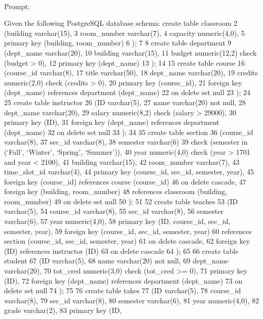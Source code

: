 \documentclass[
  letterpaper,
  DIV=11,
  numbers=noendperiod]{scrartcl}
\makeatletter
\let\oldparagraph\paragraph
\renewcommand{\paragraph}{
    \@ifstar
      \xxxParagraphStar
      \xxxParagraphNoStar
  }
\newcommand{\xxxParagraphStar}[1]{\oldparagraph*{#1}\mbox{}}
\newcommand{\xxxParagraphNoStar}[1]{\oldparagraph{#1}\mbox{}}
\makeatother
\begin{document}
\paragraph{Prompt:}\label{prompt-1}

Given the following PostgreSQL database schema: create table classroom 2
(building varchar(15), 3 room\_number varchar(7), 4 capacity
numeric(4,0), 5 primary key (building, room\_number) 6 ); 7 8 create
table department 9 (dept\_name varchar(20), 10 building varchar(15), 11
budget numeric(12,2) check (budget \textgreater{} 0), 12 primary key
(dept\_name) 13 ); 14 15 create table course 16 (course\_id varchar(8),
17 title varchar(50), 18 dept\_name varchar(20), 19 credits numeric(2,0)
check (credits \textgreater{} 0), 20 primary key (course\_id), 21
foreign key (dept\_name) references department (dept\_name) 22 on delete
set null 23 ); 24 25 create table instructor 26 (ID varchar(5), 27 name
varchar(20) not null, 28 dept\_name varchar(20), 29 salary numeric(8,2)
check (salary \textgreater{} 29000), 30 primary key (ID), 31 foreign key
(dept\_name) references department (dept\_name) 32 on delete set null 33
); 34 35 create table section 36 (course\_id varchar(8), 37 sec\_id
varchar(8), 38 semester varchar(6) 39 check (semester in (`Fall',
`Winter', `Spring', `Summer')), 40 year numeric(4,0) check (year
\textgreater{} 1701 and year \textless{} 2100), 41 building varchar(15),
42 room\_number varchar(7), 43 time\_slot\_id varchar(4), 44 primary key
(course\_id, sec\_id, semester, year), 45 foreign key (course\_id)
references course (course\_id) 46 on delete cascade, 47 foreign key
(building, room\_number) 48 references classroom (building,
room\_number) 49 on delete set null 50 ); 51 52 create table teaches 53
(ID varchar(5), 54 course\_id varchar(8), 55 sec\_id varchar(8), 56
semester varchar(6), 57 year numeric(4,0), 58 primary key (ID,
course\_id, sec\_id, semester, year), 59 foreign key (course\_id,
sec\_id, semester, year) 60 references section (course\_id, sec\_id,
semester, year) 61 on delete cascade, 62 foreign key (ID) references
instructor (ID) 63 on delete cascade 64 ); 65 66 create table student 67
(ID varchar(5), 68 name varchar(20) not null, 69 dept\_name varchar(20),
70 tot\_cred numeric(3,0) check (tot\_cred \textgreater= 0), 71 primary
key (ID), 72 foreign key (dept\_name) references department (dept\_name)
73 on delete set null 74 ); 75 76 create table takes 77 (ID varchar(5),
78 course\_id varchar(8), 79 sec\_id varchar(8), 80 semester varchar(6),
81 year numeric(4,0), 82 grade varchar(2), 83 primary key (ID,
\end{document}
